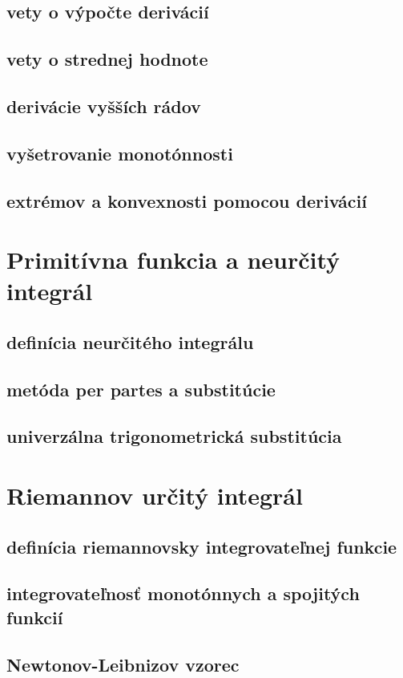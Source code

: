 \subsection{vety o výpočte derivácií}
\subsection{vety o strednej hodnote}
\subsection{derivácie vyšších rádov}
\subsection{vyšetrovanie monotónnosti}
\subsection{extrémov a konvexnosti pomocou derivácií}


\section{Primitívna funkcia a neurčitý integrál}
\subsection{definícia neurčitého integrálu}
\subsection{metóda per partes a substitúcie}
\subsection{univerzálna trigonometrická substitúcia}


\section{Riemannov určitý integrál}
\subsection{definícia riemannovsky integrovateľnej funkcie}
\subsection{integrovateľnosť monotónnych a spojitých funkcií}
\subsection{Newtonov-Leibnizov vzorec}
